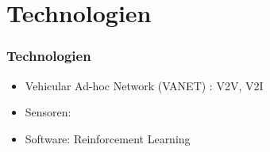 \section{Technologien}


\begin{frame}
    \frametitle{Technologien}

    
    \begin{itemize}
        \item Vehicular Ad-hoc Network (VANET) \cite{10.1007/978-3-642-31368-4_6}: V2V, V2I
        \item Sensoren:
        \item Software: Reinforcement Learning
    \end{itemize}

\end{frame}